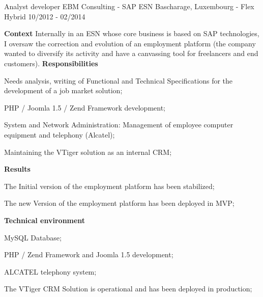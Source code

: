 \begin{cventries}
  \cventry
    {Analyst developer} %
    {EBM Consulting - SAP ESN} %
    {Bascharage, Luxembourg - Flex Hybrid} %
    {10/2012 - 02/2014} %
    {
      \textbf{Context}
      \newline
      Internally in an ESN whose core business is based on SAP technologies, I oversaw the correction 
      and evolution of an employment platform (the company wanted to diversify its activity and have 
      a canvassing tool for freelancers and end customers).
      \newline \vspace{2pt}
      \textbf{Responsibilities}
      \newline \vspace{12pt}
      \begin{cvitems}
        \item {Needs analysis, writing of Functional and Technical Specifications for the development of a job market solution;}
        \item {PHP / Joomla 1.5 / Zend Framework development;}
        \item {System and Network Administration: Management of employee computer equipment and telephony (Alcatel);}
        \item {Maintaining the VTiger solution as an internal CRM;}
      \end{cvitems}
      \textbf{Results}
      \newline \vspace{12pt}
      \begin{cvitems}
        \item {The Initial version of the employment platform has been stabilized;}
        \item {The new Version of the employment platform has been deployed in MVP;}
      \end{cvitems}
      \textbf{Technical environment}
      \newline \vspace{12pt}
      \begin{cvitems}
        \item {MySQL Database;}
        \item {PHP / Zend Framework and Joomla 1.5 development;}
        \item {ALCATEL telephony system;}
        \item {The VTiger CRM Solution is operational and has been deployed in production;}
      \end{cvitems}
    }


\end{cventries}
